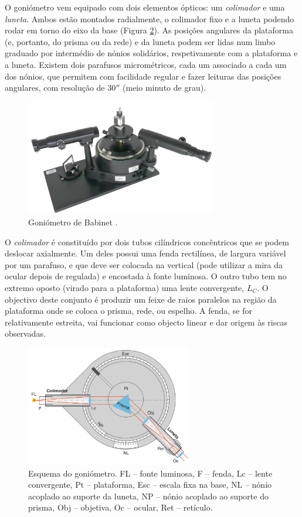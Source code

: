 \documentclass[a4paper,twoside,11pt]{report}      %
\begin{document}
O goniómetro vem equipado com dois elementos ópticos: um \emph{colimador} e uma \emph{luneta}. Ambos estão montados radialmente, o colimador fixo e a luneta podendo rodar em torno do eixo da base (Figura \ref{fig:babinet}). As posições angulares da plataforma (e, portanto, do prisma ou da rede) e da luneta podem ser lidas num limbo graduado por intermédio de nónios solidários, respetivamente com a plataforma e a luneta. Existem dois parafusos micrométricos, cada um associado a cada um dos nónios, que permitem com facilidade regular e fazer leituras das posições angulares, com resolução de $30''$ (meio minuto de grau).

\begin{figure}  
\centering 
	\includegraphics[width=0.75\textwidth]{goniometer}
	\caption{Goniómetro de Babinet . \label{fig:goniometer}} 
\end{figure}

O \emph{colimador} é constituído por dois tubos cilíndricos concêntricos que se podem deslocar axialmente. Um deles possui uma fenda rectilínea, de largura variável por um parafuso, e que deve ser colocada na vertical (pode utilizar a mira da ocular depois de regulada) e encostada à fonte luminosa. O outro tubo tem no extremo oposto (virado para a plataforma) uma lente convergente, $L_C$. O objectivo deste conjunto é produzir um feixe de raios paralelos na região da plataforma onde se coloca o prisma, rede, ou espelho. A fenda, se for relativamente estreita, vai funcionar como objecto linear e dar origem às riscas observadas.

\begin{figure}
	\centering 
	\includegraphics[width=0.65\textwidth]{Babinet}
	\caption{Esquema do goniómetro. FL -- fonte luminosa, F -- fenda, Lc -- lente convergente, Pt -- plataforma, Esc -- escala fixa na base, NL -- nónio acoplado ao suporte da luneta, NP -- nónio acoplado ao suporte do prisma, Obj -- objetiva, Oc -- ocular, Ret -- retículo.
	\label{fig:babinet}} 
\end{figure}
\end{document}

